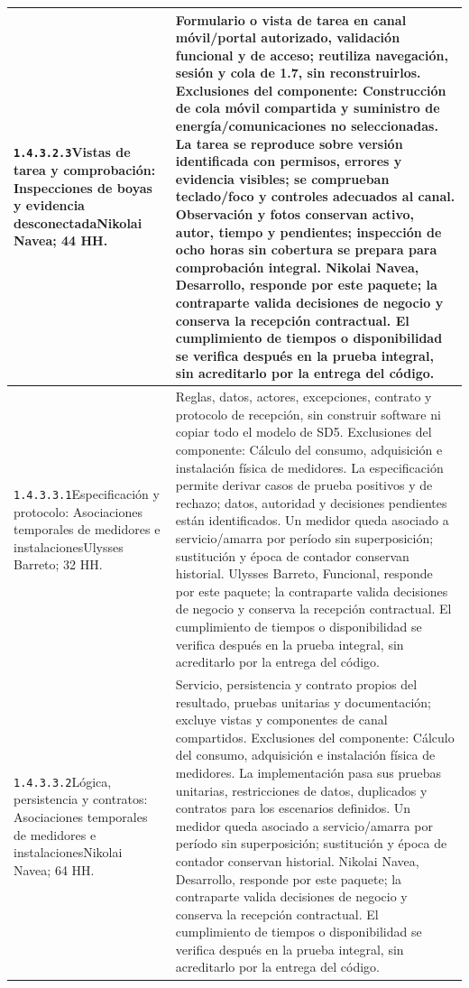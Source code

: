 \begin{longtable}{L{52mm}L{91mm}}
\texttt{1.\allowbreak{}4.\allowbreak{}3.\allowbreak{}2.\allowbreak{}3}\newline Vistas de tarea y comprobación: Inspecciones de boyas y evidencia desconectada\newline Nikolai Navea; 44 HH. & Formulario o vista de tarea en canal móvil/portal autorizado, validación funcional y de acceso; reutiliza navegación, sesión y cola de 1.7, sin reconstruirlos. Exclusiones del componente: Construcción de cola móvil compartida y suministro de energía/comunicaciones no seleccionadas. La tarea se reproduce sobre versión identificada con permisos, errores y evidencia visibles; se comprueban teclado/foco y controles adecuados al canal. Observación y fotos conservan activo, autor, tiempo y pendientes; inspección de ocho horas sin cobertura se prepara para comprobación integral. Nikolai Navea, Desarrollo, responde por este paquete; la contraparte valida decisiones de negocio y conserva la recepción contractual. El cumplimiento de tiempos o disponibilidad se verifica después en la prueba integral, sin acreditarlo por la entrega del código.\\\hline
\texttt{1.\allowbreak{}4.\allowbreak{}3.\allowbreak{}3.\allowbreak{}1}\newline Especificación y protocolo: Asociaciones temporales de medidores e instalaciones\newline Ulysses Barreto; 32 HH. & Reglas, datos, actores, excepciones, contrato y protocolo de recepción, sin construir software ni copiar todo el modelo de SD5. Exclusiones del componente: Cálculo del consumo, adquisición e instalación física de medidores. La especificación permite derivar casos de prueba positivos y de rechazo; datos, autoridad y decisiones pendientes están identificados. Un medidor queda asociado a servicio/amarra por período sin superposición; sustitución y época de contador conservan historial. Ulysses Barreto, Funcional, responde por este paquete; la contraparte valida decisiones de negocio y conserva la recepción contractual. El cumplimiento de tiempos o disponibilidad se verifica después en la prueba integral, sin acreditarlo por la entrega del código.\\\hline
\texttt{1.\allowbreak{}4.\allowbreak{}3.\allowbreak{}3.\allowbreak{}2}\newline Lógica, persistencia y contratos: Asociaciones temporales de medidores e instalaciones\newline Nikolai Navea; 64 HH. & Servicio, persistencia y contrato propios del resultado, pruebas unitarias y documentación; excluye vistas y componentes de canal compartidos. Exclusiones del componente: Cálculo del consumo, adquisición e instalación física de medidores. La implementación pasa sus pruebas unitarias, restricciones de datos, duplicados y contratos para los escenarios definidos. Un medidor queda asociado a servicio/amarra por período sin superposición; sustitución y época de contador conservan historial. Nikolai Navea, Desarrollo, responde por este paquete; la contraparte valida decisiones de negocio y conserva la recepción contractual. El cumplimiento de tiempos o disponibilidad se verifica después en la prueba integral, sin acreditarlo por la entrega del código.\\\hline

\end{longtable}
